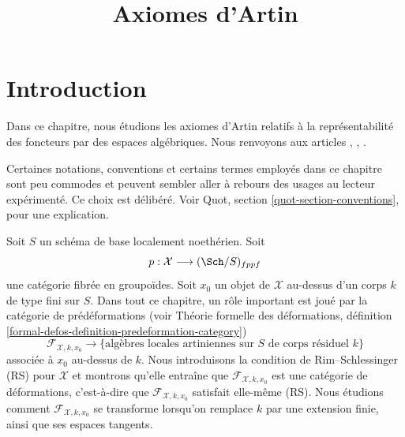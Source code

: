 

%


\title{Axiomes d'Artin}

\maketitle

\label{section-phantom}

\tableofcontents




\section{Introduction}
\label{section-introduction}

\noindent
Dans ce chapitre, nous étudions les axiomes d'Artin relatifs à la
représentabilité des foncteurs par des espaces algébriques. Nous renvoyons aux articles
\cite{ArtinI}, \cite{ArtinII}, \cite{ArtinVersal}.

\medskip\noindent
Certaines notations, conventions et certains termes employés dans ce chapitre sont peu commodes
et peuvent sembler aller à rebours des usages au lecteur expérimenté. Ce choix est délibéré.
Voir Quot, section \ref{quot-section-conventions}, pour une
explication.

\medskip\noindent
Soit $S$ un schéma de base localement noethérien. Soit
$$
p : \mathcal{X} \longrightarrow (\Sch/S)_{fppf}
$$
une catégorie fibrée en groupoïdes. Soit $x_0$ un objet de $\mathcal{X}$
au-dessus d'un corps $k$ de type fini sur $S$. Dans tout ce chapitre, un rôle
important est joué par la catégorie de prédéformations
(voir Théorie formelle des déformations,
définition \ref{formal-defos-definition-predeformation-category})
$$
\mathcal{F}_{\mathcal{X}, k, x_0}
\longrightarrow
\{\text{algèbres locales artiniennes sur }S\text{ de corps résiduel }k\}
$$
associée à $x_0$ au-dessus de $k$. Nous introduisons la condition de Rim--Schlessinger (RS)
pour $\mathcal{X}$ et montrons qu'elle entraîne que
$\mathcal{F}_{\mathcal{X}, k, x_0}$ est une catégorie de déformations, c'est-à-dire que
$\mathcal{F}_{\mathcal{X}, k, x_0}$ satisfait elle-même (RS).
Nous étudions comment $\mathcal{F}_{\mathcal{X}, k, x_0}$
se transforme lorsqu'on remplace $k$ par une extension finie,
ainsi que ses espaces tangents.


